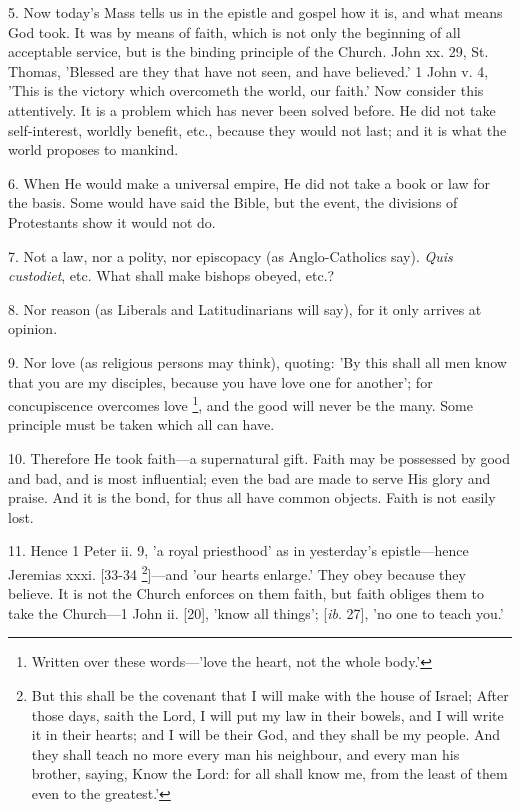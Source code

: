 5. Now today's Mass tells us in the epistle and
gospel how it is, and what means God took. It was by means of faith,
which is not only the beginning of all acceptable service, but is the
binding principle of the Church. John xx. 29, St. Thomas, 'Blessed are
they that have not seen, and have believed.' 1 John v. 4, 'This is the
victory which overcometh the world, our faith.' Now consider this
attentively. It is a problem which has never been solved before. He
did not take self-interest, worldly benefit, etc., because they would
not last; and it is what the world proposes to mankind.

6. When He would make a universal empire, He did
not take a book or law for the basis. Some would have said the Bible,
but the event, the divisions of Protestants show it would not do.

7. Not a law, nor a polity, nor episcopacy (as
Anglo-Catholics say). \emph{Quis custodiet}, etc. What shall make
bishops obeyed, etc.?

8. Nor reason (as Liberals and Latitudinarians
will say), for it only arrives at opinion.

9. Nor love (as religious persons may think),
quoting: 'By this shall all men know that you are my disciples,
because you have love one for another'; for concupiscence overcomes
love \footnote{Written over these
words—'love the heart, not the whole body.'}, and the good will never be the many. Some principle must be taken which all can
have.

10. Therefore He took faith—a supernatural
gift. Faith may be possessed by good and bad, and is most influential;
even the bad are made to serve His glory and praise. And it is the
bond, for thus all have common objects. Faith is not easily lost.

11. Hence 1 Peter ii. 9, 'a royal priesthood' as
in yesterday's epistle—hence Jeremias xxxi. [33-34 \footnote{But this shall be the
covenant that I will make with the house of Israel; After those days,
saith the Lord, I will put my law in their bowels, and I will write it
in their hearts; and I will be their God, and they shall be my people.
And they shall teach no more every man his neighbour, and every man
his brother, saying, Know the Lord: for all shall know me, from the
least of them even to the greatest.'}]—and 'our hearts enlarge.' They obey because they believe. It
is not the Church enforces on them faith, but faith obliges them to
take the Church—1 John ii. [20], 'know all things'; [\emph{ib}. 27],
'no one to teach you.'

